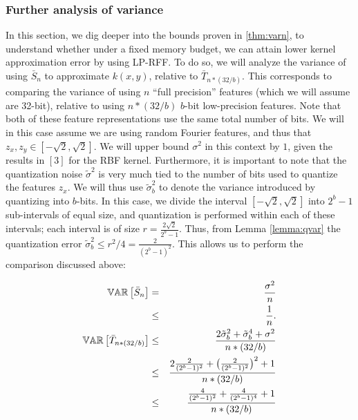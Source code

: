 \documentclass[12pt]{article}
\newcommand{\bS}{\bar{S}}
\newcommand{\bT}{\bar{T}}
\newcommand{\sq}{\sqrt{2}}
\newcommand{\tsigma}{\tilde{\sigma}}
\begin{document}
\subsubsection{Further analysis of variance}
In this section, we dig deeper into the bounds proven in \ref{thm:varn}, to understand whether under a fixed memory budget, we can attain lower kernel approximation error by using LP-RFF.
To do so, we will analyze the variance of using $\bS_n$ to approximate $k(x,y)$, relative to $\bT_{n*(32/b)}$.  This corresponds to comparing the variance of using $n$ ``full precision''  features (which we will assume are 32-bit), relative to using $n*(32/b)$ $b$-bit low-precision features. Note that both of these feature representations use the same total number of bits.  We will in this case assume we are using random Fourier features, and thus that
$z_x,z_y \in [-\sq,\sq]$.  We will upper bound $\sigma^2$ in this context by $1$, given the results in $[3]$ for the RBF kernel.  Furthermore, it is important to note that the quantization noise $\tsigma^2$ is very much tied to the number of bits used to quantize the features $z_x$.  We will thus use $\tsigma_b^2$ to denote the variance introduced by quantizing into $b$-bits.  In this case, we divide the interval $[-\sq,\sq]$ into $2^b-1$ sub-intervals of equal size, and quantization is performed within each of these intervals; each interval is of size $r = \frac{2\sq}{2^b-1}$. 
Thus, from Lemma \ref{lemma:qvar} the quantization error $\tsigma_b^2 \leq r^2/4 = \frac{2}{(2^b-1)^2}$.  This allows us to perform the comparison discussed above:

\begin{eqnarray*}
	\var{}{\bS_n} &=& \frac{\sigma^2}{n} \\
	&\leq& \frac{1}{n}. \\
	\var{}{\bT_{n*(32/b)}} &\leq& \frac{2\tsigma_b^2 + \tsigma_b^4 +  \sigma^2}{n*(32/b)} \\
	&\leq& \frac{2\frac{2}{(2^b-1)^2}  + \big(\frac{2}{(2^b-1)^2}\big)^2+ 1}{n*(32/b)}\\
	&\leq& \frac{\frac{4}{(2^b-1)^2} + \frac{4}{(2^b-1)^4} +  1}{n*(32/b)}\\
\end{eqnarray*}
\end{document}
